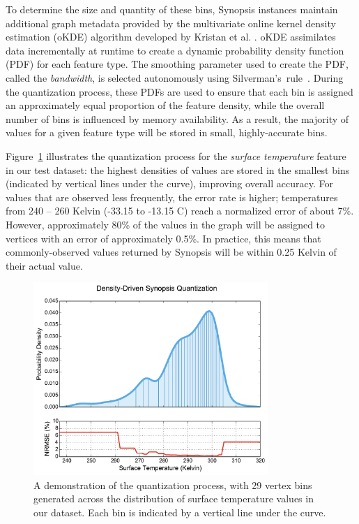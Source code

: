 To determine the size and quantity of these bins, Synopsis instances maintain additional graph metadata provided by the multivariate online kernel density estimation (oKDE) algorithm developed by Kristan et al. \cite{kristan2011multivariate}. oKDE assimilates data incrementally at runtime to create a dynamic probability density function (PDF) for each feature type. The smoothing parameter used to create the PDF, called the \emph{bandwidth}, is selected autonomously using Silverman's~rule~\cite{silverman1986density}. During the quantization process, these PDFs are used to ensure that each bin is assigned an approximately equal proportion of the feature density, while the overall number of bins is influenced by memory availability. As a result, the majority of values for a given feature type will be stored in small, highly-accurate bins.

Figure~\ref{fig:quantization} illustrates the quantization process for the \emph{surface temperature} feature in our test dataset: the highest densities of values are stored in the smallest bins (indicated by vertical lines under the curve), improving overall accuracy. For values that are observed less frequently, the error rate is higher; temperatures from 240 -- 260 Kelvin (-33.15 to -13.15 \degree C) reach a normalized error of about 7\%. However, approximately 80\% of the values in the graph will be assigned to vertices with an error of approximately 0.5\%. In practice, this means that commonly-observed values returned by Synopsis will be within 0.25 Kelvin of their actual value.

\begin{figure}
    \centerline{\includegraphics[width=3.5in]{figures/quantization.pdf}}
    \caption{A demonstration of the quantization process, with 29 vertex bins generated across the distribution of surface temperature values in our dataset. Each bin is indicated by a vertical line under the curve.}
    \label{fig:quantization}
\end{figure}


